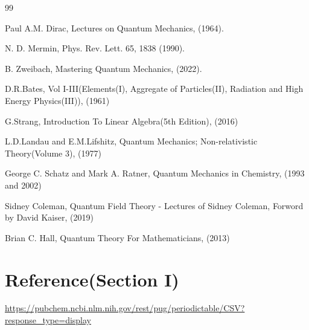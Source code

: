 \documentclass[a4paper, 10pt, onepage]{elegantbook}
\begin{document}
\begin{thebibliography}{99}

Paul A.M. Dirac, Lectures on Quantum Mechanics, (1964).

N. D. Mermin,  Phys. Rev. Lett. 65, 1838 (1990).

B. Zweibach, Mastering Quantum Mechanics, (2022).

D.R.Bates, Vol I-III(Elements(I), Aggregate of Particles(II), Radiation and High Energy Physics(III)), (1961)

G.Strang, Introduction To Linear Algebra(5th Edition), (2016)

L.D.Landau and E.M.Lifshitz, Quantum Mechanics; Non-relativistic Theory(Volume 3), (1977)

George C. Schatz and Mark A. Ratner, Quantum Mechanics in Chemistry, (1993 and 2002)

Sidney Coleman, Quantum Field Theory - Lectures of Sidney Coleman, Forword by David Kaiser, (2019)

Brian C. Hall, Quantum Theory For Mathematicians, (2013)

\end{thebibliography}

\chapter{Reference(Section I)}

\url{https://pubchem.ncbi.nlm.nih.gov/rest/pug/periodictable/CSV?response_type=display} \\
\end{document}
